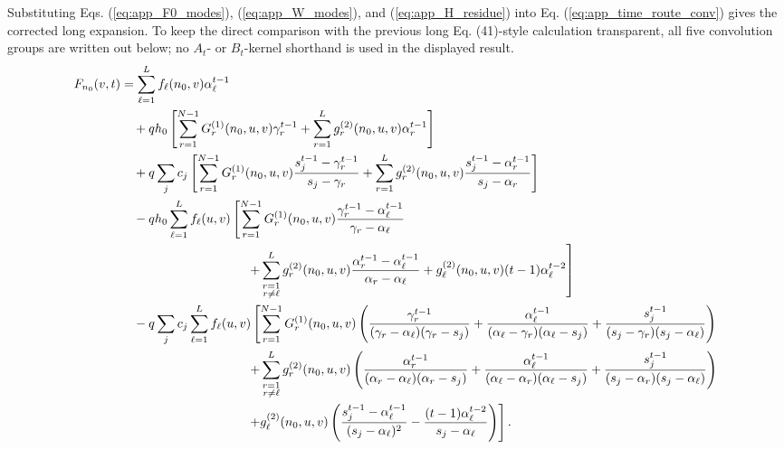 \documentclass[superscriptaddress, amsmath, amssymb, aps, pre, floatfix]{revtex4-2}
\begin{document}
Substituting Eqs. (\ref{eq:app_F0_modes}), (\ref{eq:app_W_modes}), and (\ref{eq:app_H_residue}) into Eq. (\ref{eq:app_time_route_conv}) gives the corrected long expansion.  To keep the direct comparison with the previous long Eq. (41)-style calculation transparent, all five convolution groups are written out below; no \(A_t\)- or \(B_t\)-kernel shorthand is used in the displayed result.
\begingroup
\scriptsize
\setlength{\jot}{3pt}
\begin{align}
F_{n_0}(v,t)
&=
\sum_{\ell=1}^{L}f_\ell(n_0,v)\alpha_\ell^{t-1}
\nonumber\\
&\quad
+q h_0
\left[
\sum_{r=1}^{N-1}G^{(1)}_r(n_0,u,v)\gamma_r^{t-1}
+\sum_{r=1}^{L}g^{(2)}_r(n_0,u,v)\alpha_r^{t-1}
\right]
\nonumber\\
&\quad
+q\sum_j c_j
\left[
\sum_{r=1}^{N-1}G^{(1)}_r(n_0,u,v)
\frac{s_j^{t-1}-\gamma_r^{t-1}}{s_j-\gamma_r}
+\sum_{r=1}^{L}g^{(2)}_r(n_0,u,v)
\frac{s_j^{t-1}-\alpha_r^{t-1}}{s_j-\alpha_r}
\right]
\nonumber\\
&\quad
-q h_0\sum_{\ell=1}^{L}f_\ell(u,v)
\left[
\sum_{r=1}^{N-1}G^{(1)}_r(n_0,u,v)
\frac{\gamma_r^{t-1}-\alpha_\ell^{t-1}}{\gamma_r-\alpha_\ell}
\right.
\nonumber\\
&\hspace{35mm}\left.
+\sum_{\substack{r=1\\r\neq\ell}}^{L}g^{(2)}_r(n_0,u,v)
\frac{\alpha_r^{t-1}-\alpha_\ell^{t-1}}{\alpha_r-\alpha_\ell}
+g^{(2)}_\ell(n_0,u,v)(t-1)\alpha_\ell^{t-2}
\right]
\nonumber\\
&\quad
-q\sum_j c_j\sum_{\ell=1}^{L}f_\ell(u,v)
\left[
\sum_{r=1}^{N-1}G^{(1)}_r(n_0,u,v)
\left(
\frac{\gamma_r^{t-1}}{(\gamma_r-\alpha_\ell)(\gamma_r-s_j)}
+\frac{\alpha_\ell^{t-1}}{(\alpha_\ell-\gamma_r)(\alpha_\ell-s_j)}
+\frac{s_j^{t-1}}{(s_j-\gamma_r)(s_j-\alpha_\ell)}
\right)
\right.
\nonumber\\
&\hspace{35mm}\left.
+\sum_{\substack{r=1\\r\neq\ell}}^{L}g^{(2)}_r(n_0,u,v)
\left(
\frac{\alpha_r^{t-1}}{(\alpha_r-\alpha_\ell)(\alpha_r-s_j)}
+\frac{\alpha_\ell^{t-1}}{(\alpha_\ell-\alpha_r)(\alpha_\ell-s_j)}
+\frac{s_j^{t-1}}{(s_j-\alpha_r)(s_j-\alpha_\ell)}
\right)
\right.
\nonumber\\
&\hspace{35mm}\left.
+g^{(2)}_\ell(n_0,u,v)
\left(
\frac{s_j^{t-1}-\alpha_\ell^{t-1}}{(s_j-\alpha_\ell)^2}
-\frac{(t-1)\alpha_\ell^{t-2}}{s_j-\alpha_\ell}
\right)
\right].
\label{eq:app_hard_route_result}
\end{align}
\end{document}
